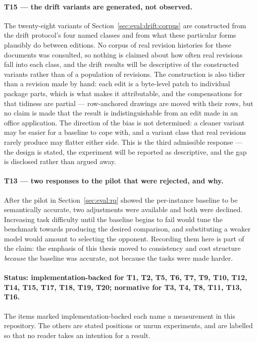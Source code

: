 \paragraph{T15 --- the drift variants are generated, not observed.}
The twenty-eight variants of Section~\ref{sec:eval:drift:corpus} are constructed from the
drift protocol's four named classes and from what these particular forms plausibly do between
editions. No corpus of real revision histories for these documents was consulted, so nothing
is claimed about how often real revisions fall into each class, and the drift results will be
descriptive of the constructed variants rather than of a population of revisions. The
construction is also tidier than a revision made by hand: each edit is a byte-level patch to
individual package parts, which is what makes it attributable, and the compensations for that
tidiness are partial --- row-anchored drawings are moved with their rows, but no claim is made
that the result is indistinguishable from an edit made in an office application. The direction
of the bias is not determined: a cleaner variant may be easier for a baseline to cope with, and
a variant class that real revisions rarely produce may flatter either side. This is the third
admissible response --- the design is stated, the experiment will be reported as descriptive,
and the gap is disclosed rather than argued away.

\paragraph{T13 --- two responses to the pilot that were rejected, and why.}
After the pilot in Section~\ref{sec:eval:rq} showed the per-instance baseline to be
semantically accurate, two adjustments were available and both were declined. Increasing task
difficulty until the baseline begins to fail would tune the benchmark towards producing the
desired comparison, and substituting a weaker model would amount to selecting the opponent.
Recording them here is part of the claim: the emphasis of this thesis moved to consistency and
cost structure \emph{because} the baseline was accurate, not because the tasks were made
harder.

\paragraph{Status: implementation-backed for T1, T2, T5, T6, T7, T9, T10, T12, T14, T15,
T17, T18, T19, T20; normative for T3, T4, T8, T11, T13, T16.}
The items marked implementation-backed each name a measurement in this repository. The others
are stated positions or unrun experiments, and are labelled so that no reader takes an
intention for a result.

